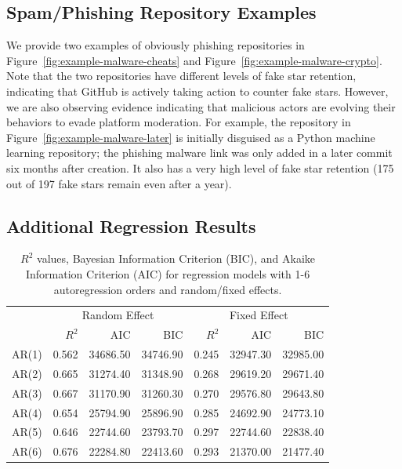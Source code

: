 \subsection{Spam/Phishing Repository Examples}

We provide two examples of obviously phishing repositories in Figure~\ref{fig:example-malware-cheats} and Figure~\ref{fig:example-malware-crypto}.
Note that the two repositories have different levels of fake star retention, indicating that GitHub is actively taking action to counter fake stars.
However, we are also observing evidence indicating that malicious actors are evolving their behaviors to evade platform moderation.
For example, the repository in Figure~\ref{fig:example-malware-later} is initially disguised as a Python machine learning repository; the phishing malware link was only added in a later commit six months after creation.  
It also has a very high level of fake star retention (175 out of 197 fake stars remain even after a year).

\subsection{Additional Regression Results} 
\label{sec:fake-stars-appendix-regression}

\begin{table}
    \small
    \centering
    \setlength{\tabcolsep}{5pt}
    \caption{$R^2$ values, Bayesian Information Criterion (BIC), and Akaike Information Criterion (AIC) for regression models with 1-6 autoregression orders and random/fixed effects.}
    \begin{tabular}{lrrrrrr}
    \toprule
         & \multicolumn{3}{c}{Random Effect} & \multicolumn{3}{c}{Fixed Effect} \\
         &  $R^2$ & AIC & BIC & $R^2$ &  AIC & BIC \\
    \midrule
       AR(1) & 0.562 & 34686.50 & 34746.90 & 0.245 & 32947.30 & 32985.00\\
       AR(2) & 0.665 &31274.40 & 31348.90 & 0.268 & 29619.20 & 29671.40\\
       AR(3) & 0.667 & 31170.90 & 31260.30 & 0.270 & 29576.80 & 29643.80\\
       AR(4) & 0.654 & 25794.90 & 25896.90 & 0.285 & 24692.90 & 24773.10\\
       AR(5) & 0.646 & 22744.60 & 23793.70 & 0.297 & 22744.60 & 22838.40\\
       AR(6) & 0.676 & 22284.80 & 22413.60 & 0.293 & 21370.00 & 21477.40\\
    \bottomrule
    \end{tabular}
    \label{tab:ic}
\end{table}

